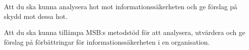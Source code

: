 \item Att du ska kunna analysera hot mot informationssäkerheten och ge förslag 
på skydd mot dessa hot.
\item Att du ska kunna tillämpa MSB:s metodstöd för att analysera, utvärdera 
och ge förslag på förbättringar för informationssäkerheten i en organisation.

